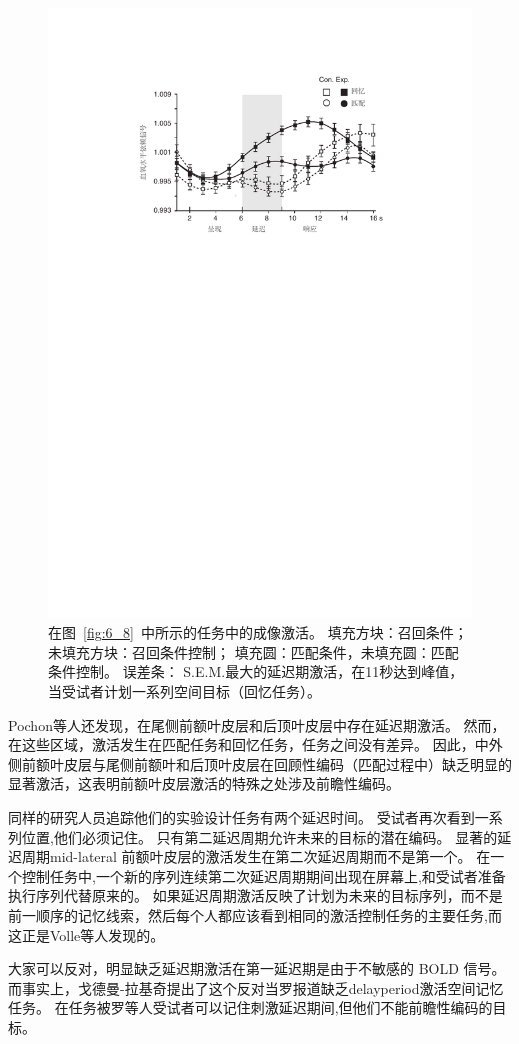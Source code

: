 \begin{figure}
	\centering
	\includegraphics[width=0.6\linewidth]{chap6/6_9}
	\caption{在图~\ref{fig:6_8}~中所示的任务中的成像激活。
		填充方块：召回条件；未填充方块：召回条件控制；
		填充圆：匹配条件，未填充圆：匹配条件控制。
		误差条： S.E.M.最大的延迟期激活，在11秒达到峰值，当受试者计划一系列空间目标（回忆任务）\cite{pochon2001role}。}
	\label{fig:6_9}
\end{figure}


Pochon等人还发现，在尾侧前额叶皮层和后顶叶皮层中存在延迟期激活。
然而，在这些区域，激活发生在匹配任务和回忆任务，任务之间没有差异。
因此，中外侧前额叶皮层与尾侧前额叶和后顶叶皮层在回顾性编码（匹配过程中）缺乏明显的显著激活，这表明前额叶皮层激活的特殊之处涉及前瞻性编码。


同样的研究人员追踪他们的实验设计任务有两个延迟时间\cite{volle2005specific}。
受试者再次看到一系列位置,他们必须记住。
只有第二延迟周期允许未来的目标的潜在编码。
显著的延迟周期mid-lateral 前额叶皮层的激活发生在第二次延迟周期而不是第一个。
在一个控制任务中,一个新的序列连续第二次延迟周期期间出现在屏幕上,和受试者准备执行序列代替原来的。
如果延迟周期激活反映了计划为未来的目标序列，而不是前一顺序的记忆线索，然后每个人都应该看到相同的激活控制任务的主要任务,而这正是Volle等人发现的。


大家可以反对，明显缺乏延迟期激活在第一延迟期是由于不敏感的 BOLD 信号。
而事实上，戈德曼-拉基奇\cite{goldman2002functional}提出了这个反对当罗\cite{rowe2000prefrontal}报道缺乏delayperiod激活空间记忆任务。
在任务被罗等人受试者可以记住刺激延迟期间,但他们不能前瞻性编码的目标。


